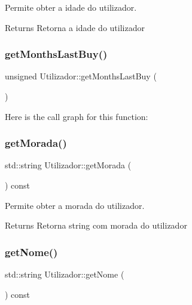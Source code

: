 Permite obter a idade do utilizador. 

\begin{DoxyReturn}{Returns}
Retorna a idade do utilizador 
\end{DoxyReturn}
\mbox{\label{class_utilizador_a8c4c3275a56142c31f19c7af78e3c88f}} 
\subsubsection{\texorpdfstring{get\+Months\+Last\+Buy()}{getMonthsLastBuy()}}
{\footnotesize\ttfamily unsigned Utilizador\+::get\+Months\+Last\+Buy (\begin{DoxyParamCaption}{ }\end{DoxyParamCaption})}

Here is the call graph for this function\+:
\mbox{\label{class_utilizador_aea27372a36fb8e59d2f3029464d83101}} 
\subsubsection{\texorpdfstring{get\+Morada()}{getMorada()}}
{\footnotesize\ttfamily std\+::string Utilizador\+::get\+Morada (\begin{DoxyParamCaption}{ }\end{DoxyParamCaption}) const}



Permite obter a morada do utilizador. 

\begin{DoxyReturn}{Returns}
Retorna string com morada do utilizador 
\end{DoxyReturn}
\mbox{\label{class_utilizador_a82874cffab116aa572f58576511b0e24}} 
\subsubsection{\texorpdfstring{get\+Nome()}{getNome()}}
{\footnotesize\ttfamily std\+::string Utilizador\+::get\+Nome (\begin{DoxyParamCaption}{ }\end{DoxyParamCaption}) const}



